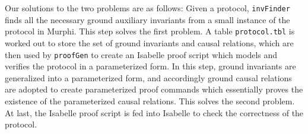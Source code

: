 \documentclass[conference]{IEEEtran}
\begin{document}
{%

Our solutions to the two problems are as follows:
Given a protocol,  \texttt{invFinder} finds all the necessary ground auxiliary invariants from a small instance of the protocol in Murphi. This step solves the first  problem.
 A table {\tt protocol.tbl} is worked out  to store the set of ground invariants and
 causal relations, which are then  used by {\tt proofGen} to
create an Isabelle proof   script which models and verifies the
protocol in a parameterized form. In this step, ground invariants
are generalized into a parameterized form, and accordingly
ground causal relations are adopted to create parameterized
proof commands which essentially proves the existence of the
parameterized causal relations. This solves the second problem.  At last, the Isabelle proof script is
fed into Isabelle to check the correctness of the protocol.

}
\end{document}
